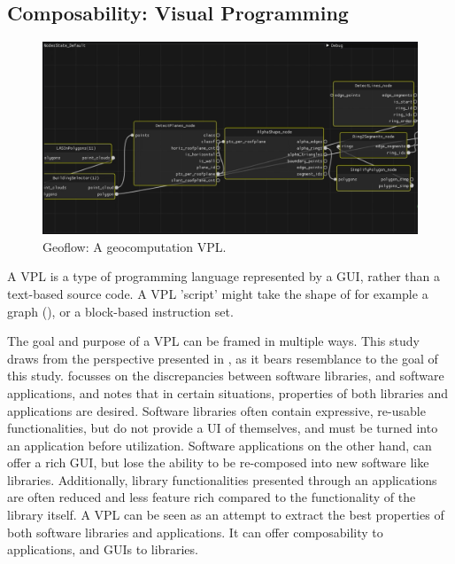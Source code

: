 \subsection*{Composability: Visual Programming}

\begin{figure}
  \centering
  \graphicspath{{../../assets/images/background/geo-vpl/}}
  \includegraphics[width=\linewidth]{geoflow.png}
  \caption{Geoflow: A geocomputation VPL. \citep{peters_geoflow_2019}}
  \label{fig:1:geoflow}
\end{figure}

A \ac{VPL} is a type of programming language represented by a \ac{GUI}, rather than a text-based source code.
A \ac{VPL} 'script' might take the shape of for example a graph (), or a block-based instruction set.

The goal and purpose of a VPL can be framed in multiple ways. 
This study draws from the perspective presented in \citep{elliott_tangible_2007}, as it bears resemblance to the goal of this study.
\citep{elliott_tangible_2007} focusses on the discrepancies between software libraries, and software applications, and notes that in certain situations, properties of both libraries and applications are desired. 
Software libraries often contain expressive, re-usable functionalities, but do not provide a \ac{UI} of themselves, and must be turned into an application before utilization.
Software applications on the other hand, can offer a rich \ac{GUI}, but lose the ability to be re-composed into new software like libraries. Additionally, library functionalities presented through an applications are often reduced and less feature rich compared to the functionality of the library itself.
A VPL can be seen as an attempt to extract the best properties of both software libraries and applications. 
It can offer composability to applications, and \ac{GUI}s to libraries.
 
